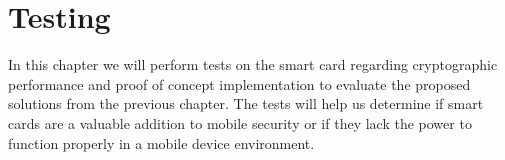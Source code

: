 \chapter{Testing}
\label{ch:testing}
In this chapter we will perform tests on the smart card regarding cryptographic performance and proof of concept implementation to evaluate the proposed solutions from the previous chapter. The tests will help us determine if smart cards are a valuable addition to mobile security or if they lack the power to function properly in a mobile device environment.








